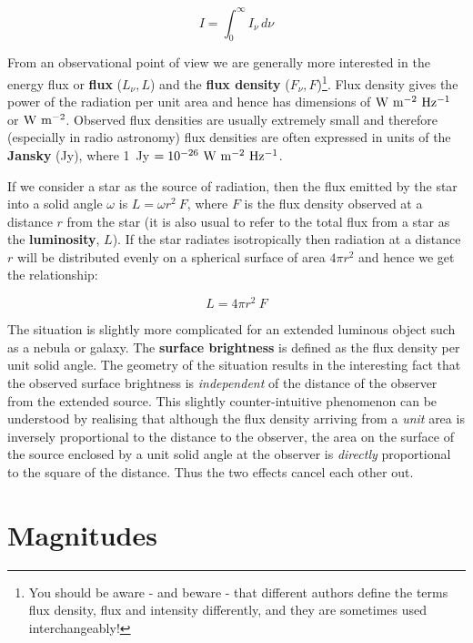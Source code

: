 \documentclass[twoside,11pt]{article}
\newcommand{\xlabel}[1]{}
\begin{document}
\begin{equation}
I= \int_{0}^{\infty}I_\nu\,d\nu
\end{equation}

From an observational point of view we are generally more interested in
the energy flux or {\bf flux} ($L_\nu, L$) and the {\bf flux density}
($F_\nu, F$)\footnote{You should be aware - and beware - that different
authors define the terms flux density, flux and intensity differently,
and they are sometimes used interchangeably!}. Flux density gives the
power of the radiation per unit area and hence has dimensions of ${\rm
W~m^{-2}~Hz^{-1}}$ or ${\rm W~m^{-2}}$. Observed flux densities are
usually extremely small and therefore (especially in radio astronomy)
flux densities are often expressed in units of the {\bf Jansky}
(Jy), where 1~Jy $= 10^{-26}~{\rm W~m^{-2}~Hz^{-1}}$.

If we consider a star as the source of radiation, then the flux
emitted by the star into a solid angle $\omega$ is $L=\omega r^2~F$,
where $F$ is the flux density observed at a distance $r$ from the
star (it is also usual to refer to the total flux from a star as the {\bf
luminosity}, $L$). If the star radiates isotropically then
radiation at a distance $r$ will be distributed evenly on a spherical
surface of area $4\pi r^2$ and hence we get the relationship:

\begin{equation}
L = 4 \pi r^2~F
\end{equation}  

The situation is slightly more complicated for an extended luminous
object such as a nebula or galaxy. The {\bf surface brightness} is
defined as the flux density per unit solid angle. The geometry of the
situation results in the interesting fact that the observed surface
brightness is {\it independent} of the distance of the observer from
the extended source. This slightly counter-intuitive phenomenon can be
understood by realising that although the flux density arriving from a
{\it unit} area is inversely proportional to the distance to the observer,
the area on the surface of the source enclosed by a unit solid angle at
the observer is {\it directly} proportional to the square of the
distance. Thus the two effects cancel each other out.


\section{\xlabel{MAGNITUDES}\label{MAGNITUDES}Magnitudes}
\end{document}
